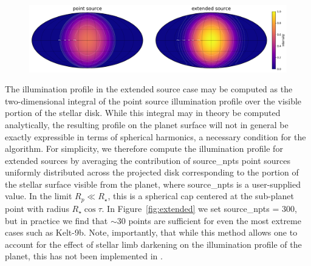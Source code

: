 \documentclass[modern]{aastex62}
\begin{document}
\begin{figure}[t!]
    \begin{centering}
        \includegraphics[width=\linewidth]{figures/extended.pdf}
    \end{centering}
\end{figure}

The illumination profile in the extended source case may be computed as the
two-dimensional integral of the point source illumination profile over
the visible portion of the stellar disk. While this integral may in theory be
computed analytically, the resulting profile on the planet surface
will not in general be exactly expressible in terms of spherical harmonics, a
necessary condition for the \starry algorithm.
For simplicity, we therefore compute the illumination profile for
extended sources by averaging the contribution of \textsf{source\_npts} point
sources uniformly distributed across the projected disk corresponding to
the portion of the stellar surface
visible from the planet, where \textsf{source\_npts} is a user-supplied
value. In the limit $R_p \ll R_\star$, this is a spherical cap centered at
the sub-planet point with radius $R_\star \cos\tau$. In
Figure~\ref{fig:extended} we set
\textsf{source\_npts} = 300, but in practice we find that ${\sim}30$
points are sufficient for even the most extreme cases such as Kelt-9b.
%
Note, importantly, that while this method allows one to account for the
effect of stellar limb darkening on the illumination profile of the planet,
this has not been implemented in \starry.
\end{document}
